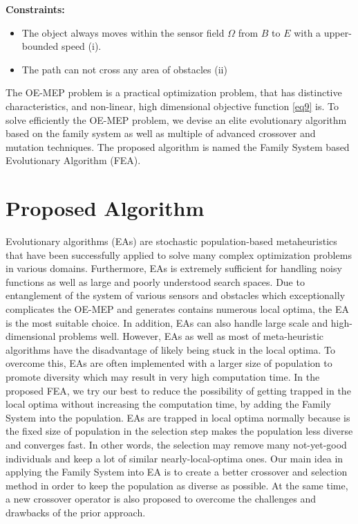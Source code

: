 \documentclass[final]{elsarticle}
\begin{document}
\textbf{Constraints:}	
\begin{itemize}
	\item The object always moves within the sensor field $\Omega $ from $B$ to $E$ with a upper-bounded speed (i).
	\item The path can not cross any area of obstacles  (ii)
\end{itemize}
	
The OE-MEP problem is a practical optimization problem, that has distinctive characteristics, and non-linear, high dimensional objective function \eqref{eq9} is. To solve efficiently the OE-MEP problem, we devise an elite evolutionary algorithm based on the family system as well as multiple of advanced crossover and mutation techniques. The proposed algorithm is named the Family System based Evolutionary Algorithm (FEA).

\section{Proposed Algorithm}
Evolutionary algorithms (EAs) are stochastic population-based metaheuristics that have been successfully applied to solve many complex optimization problems in various domains. Furthermore, EAs is extremely sufficient for handling noisy functions as well as large and poorly understood search spaces. Due to entanglement of the system of various sensors and obstacles which exceptionally complicates the OE-MEP and generates contains numerous local optima, the EA is the most suitable choice. In addition, EAs can also handle large scale and high-dimensional problems well. However, EAs as well as most of meta-heuristic algorithms have the disadvantage of likely being stuck in the local optima. To overcome this, EAs are often implemented with a larger size of population to promote diversity which may result in very high computation time. In the proposed FEA, we try our best to reduce the possibility of getting trapped in the local optima without increasing the computation time, by adding the Family System into the population. EAs are trapped in local optima normally because is the fixed size of population in the selection step makes the population less diverse and converges fast. In other words, the selection may remove many not-yet-good individuals and keep a lot of similar nearly-local-optima ones. Our main idea in applying the Family System into EA is to create a better crossover and selection method in order to keep the population as diverse as possible. At the same time, a new crossover operator is also proposed to overcome the challenges and drawbacks of the prior approach.
\end{document}
